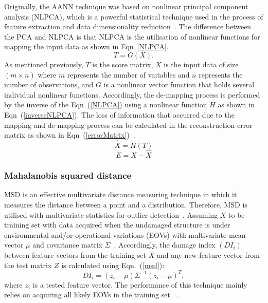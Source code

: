 Originally, the AANN technique was based on nonlinear principal component analysis (NLPCA), which is a powerful statistical technique used in the process of feature extraction and data dimensionality reduction~\cite{Dervilis2014}. 
The difference between the PCA and NLPCA is that NLPCA is the utilisation of nonlinear functions for mapping the input data as shown in Eqn~\ref{NLPCA}.
\begin{equation}
	T= G(X) .
	\label{NLPCA}
\end{equation} 
As mentioned previously, $T$ is the score matrix, $X$ is the input data of size $(m \times n)$ where $m$ represents the number of variables and $n$ represents the number of observations, and $G$ is a nonlinear vector function that holds several individual nonlinear functions.
Accordingly, the de-mapping process is performed by the inverse of the Eqn~(\ref{NLPCA}) using a nonlinear function $H$ as shown in Eqn~(\ref{inverseNLPCA}).
The loss of information that occurred due to the mapping and de-mapping process can be calculated in the reconstruction error matrix as shown in Eqn~(\ref{errorMatrix})~\cite{Dervilis2014}.
\begin{equation}
	\hat{X} = H(T)
	\label{inverseNLPCA}
\end{equation}
\begin{equation}
	E= X-\hat{X}
	\label{errorMatrix}
\end{equation}
\subsubsection{Mahalanobis squared distance}
MSD is an effective multivariate distance measuring technique in which it measures the distance between a point and a distribution.
Therefore, MSD is utilised with multivariate statistics for outlier detection~\cite{Worden2000}.
Assuming \(X\) to be training set with data acquired when the undamaged structure is under environmental and/or operational variations (EOVs) with multivariate mean vector \(\mu\) and covariance matrix \(\Sigma\)~\cite{Farrar2013}.
Accordingly, the damage index \((DI_i)\) between feature vectors from the training set \(X\) and any new feature vector from the test matrix \(Z\) is calculated using Eqn.~(\ref{msd}):
\begin{equation}
	DI_i = (z_i-\mu)\Sigma^{-1}(z_i-\mu)^T,
	\label{msd}
\end{equation}
where \(z_i\) is a tested feature vector.
The performance of this technique mainly relies on acquiring all likely EOVs in the training set~
\cite{Farrar2013}.
